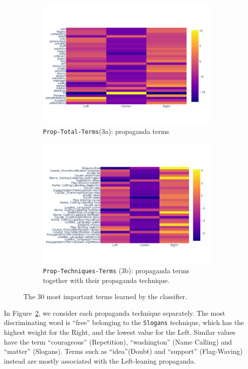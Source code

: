 \begin{figure}[!htb]
    \centering
     \begin{subfigure}[b]{\linewidth}
         \centering
         \includegraphics[width=0.75\linewidth]{figures/baly_media_weights_propaganda_tf_idf-small.pdf}
         \caption{\texttt{Prop-Total-Terms}(3a): propaganda terms}
         \label{fig:terms_weights_3a}
     \end{subfigure}
    \begin{subfigure}[b]{\linewidth}
         \centering 
         \includegraphics[width=0.75\linewidth]{figures/baly_media_weights_propaganda_techniques_tf_idf-small.pdf}
         \caption{\texttt{Prop-Techniques-Terms} (3b): propaganda terms together with their propaganda technique.}
         \label{fig:terms_weights_3b}
     \end{subfigure}
    \caption{The 30 most important terms learned by the classifier.}
    \label{fig:terms_weights}
\end{figure}

In Figure~\ref{fig:terms_weights_3b}, we consider each propaganda technique separately. The most discriminating word is ``free'' belonging to the \texttt{Slogans} technique, which has the highest weight for the Right, and the lowest value for the Left. Similar values have the term ``courageous'' (Repetition), ``washington'' (Name Calling) and ``matter'' (Slogans). Terms such as ``idea''(Doubt) and ``support'' (Flag-Waving) instead are mostly associated with the Left-leaning propaganda.

